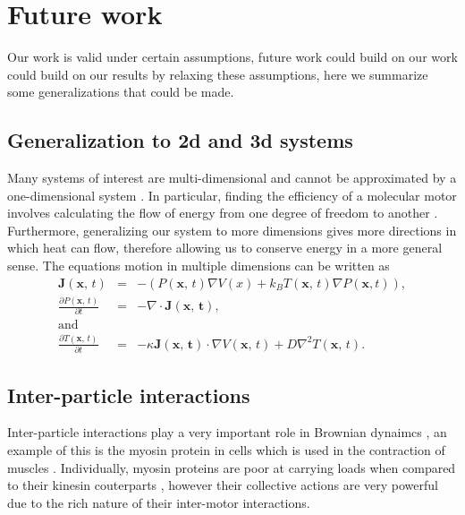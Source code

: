\section{Future work} \label{outlook}
Our work is valid under certain assumptions, future work could build on our work could build on our results by relaxing these assumptions, here we summarize some generalizations that could be made.

\subsection{Generalization to 2d and 3d systems}
Many systems of interest are multi-dimensional and cannot be approximated by a one-dimensional system \cite{KellerBustamante2000,Magnasco1994,Reimann2001,ChallisJack2014,M.W.Jack2016}. In particular, finding the efficiency of a molecular motor involves calculating the flow of energy from one degree of freedom to another \cite{M.W.Jack2016}. Furthermore, generalizing our system to more dimensions gives more directions in which heat can flow, therefore allowing us to conserve energy in a more general sense. The equations motion in multiple dimensions can be written as
\begin{eqnarray}
\mathbf{J}(\mathbf{x}, \, t) &=& - (P(\mathbf{x}, \, t) \nabla V(x) + k_B T(\mathbf{x}, \, t) \nabla P(\mathbf{x}, t)), \\
\frac{\partial P(\mathbf{x}, \, t)}{\partial t} &=& -\nabla \cdot \mathbf{J(\mathbf{x}, \, t)}, \\
\text{and} \nonumber \\
\frac{\partial T(\mathbf{x}, \, t)}{\partial t} &=& -\kappa \mathbf{J(\mathbf{x}, \, t)} \cdot \nabla V(\mathbf{x}, \, t) + D \nabla^2 T(\mathbf{x}, \, t).
\end{eqnarray}

\subsection{Inter-particle interactions}
Inter-particle interactions play a very important role in Brownian dynaimcs \cite{leibler1990physical,Leibler1993}, an example of this is the myosin protein in cells which is used in the contraction of muscles \cite{TyskaWarshaw2002}. Individually, myosin proteins are poor at carrying loads when compared to their kinesin couterparts \cite{TyskaWarshaw2002}, however their collective actions are very powerful due to the rich nature of their inter-motor interactions.

